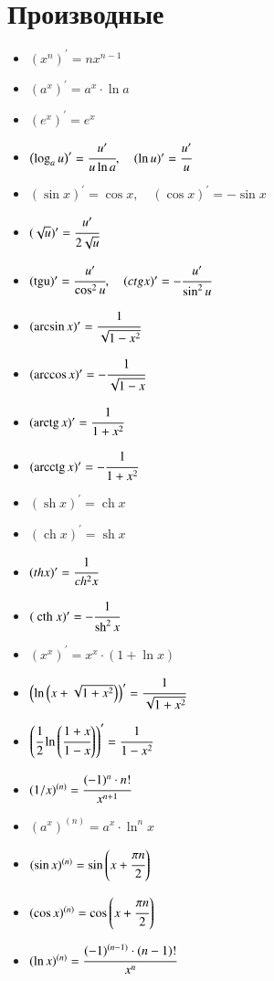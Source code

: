 \documentclass[twoside, a4paperpt]{extarticle}
\begin{document}
\section*{Производные}
\begin{multicols}{2}
    \begin{itemize}
        \item $\left(x^{n}\right)^{\prime}=n x^{n-1}$
        \item $\left(a^{x}\right)^{\prime}=a^{x} \cdot \ln a$
        \item $\left(e^{x}\right)^{\prime}=e^{x}$
        \item $\left(\log _{a} u\right)^{\prime}=\cfrac{u^{\prime}}{u \ln a}, \quad(\ln u)^{\prime}=\cfrac{u^{\prime}}{u}$
        \item $(\sin x)^{\prime}=\cos x, \quad(\cos x)^{\prime}=-\sin x$
        \item $(\sqrt{u})^{\prime}=\cfrac{u^{\prime}}{2 \sqrt{u}}$
        \item $(\operatorname{tgu})^{\prime}=\cfrac{u^{\prime}}{\cos ^{2} u}, \quad(c t g x)^{\prime}=-\cfrac{u^{\prime}}{\sin ^{2} u}$
        \item $(\arcsin x)^{\prime}=\cfrac{1}{\sqrt{1-x^{2}}}$
        \item $(\arccos x)^{\prime}=-\cfrac{1}{\sqrt{1-x}}$
        \item $(\operatorname{arctg} x)^{\prime}=\cfrac{1}{1+x^{2}}$
        \item $(\operatorname{arcctg} x)^{\prime}=-\cfrac{1}{1+x^{2}}$
        \item $(\operatorname{sh} x)^{\prime}=\operatorname{ch} x$
        \item $(\operatorname{ch} x)^{\prime}=\operatorname{sh} x$
        \item $(t h x)^{\prime}=\cfrac{1}{c h^{2} x}$
        \item $(\text { cth } x)^{\prime}=-\cfrac{1}{\operatorname{sh}^{2} x}$
        \item $\left(x^{x}\right)^{\prime}=x^{x} \cdot(1+\ln x)$
        \item $\left(\ln \left(x+\sqrt{1+x^{2}}\right)\right)^{\prime}=\cfrac{1}{\sqrt{1+x^{2}}}$
        \item $\left(\cfrac{1}{2} \ln \left(\cfrac{1+x}{1-x}\right)\right)^{\prime}=\cfrac{1}{1-x^{2}}$
        \item $(1 / x)^{(n)}=\cfrac{(-1)^{n} \cdot n !}{x^{n+1}}$
        \item $\left(a^{x}\right)^{(n)}=a^{x} \cdot \ln ^{n} x$
        \item $(\sin x)^{(n)}=\sin \left(x+\cfrac{\pi n}{2}\right)$
        \item $(\cos x)^{(n)}=\cos \left(x+\cfrac{\pi n}{2}\right)$
        \item $(\ln x)^{(n)}=\cfrac{(-1)^{(n-1)} \cdot(n-1) !}{x^{n}}$
    \end{itemize}
\end{multicols}
\end{document}

